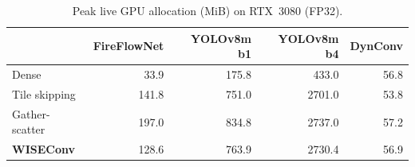 \begin{table}[htb]
  \centering
  \caption{Peak live GPU allocation (MiB) on RTX~3080 (FP32).}
  \label{tab:memory}
  \small
  \setlength{\tabcolsep}{4pt}
  \begin{tabular}{@{}lrrrr@{}}
    \toprule
    & FireFlowNet & YOLOv8m b1 & YOLOv8m b4 & DynConv \\
    \midrule
    Dense & 33.9 & 175.8 & 433.0 & 56.8 \\
    Tile skipping & 141.8 & 751.0 & 2701.0 & 53.8 \\
    Gather-scatter & 197.0 & 834.8 & 2737.0 & 57.2 \\
    \textbf{WISEConv} & 128.6 & 763.9 & 2730.4 & 56.9 \\
    \bottomrule
  \end{tabular}
\end{table}
